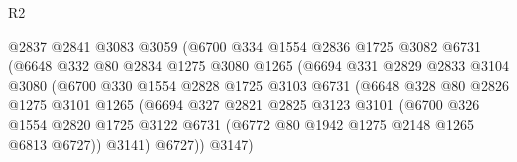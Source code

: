 \begin{lexlean}{R2}
\begin{coremodule}
                                  @2837
                                  @2841
                                  @3083
                                  @3059
                                  (@6700
                                    @334
                                    @1554
                                    @2836
                                    @1725
                                    @3082
                                    @6731
                                    (@6648
                                      @332
                                      @80
                                      @2834
                                      @1275
                                      @3080
                                      @1265
                                      (@6694
                                        @331
                                        @2829
                                        @2833
                                        @3104
                                        @3080
                                        (@6700
                                          @330
                                          @1554
                                          @2828
                                          @1725
                                          @3103
                                          @6731
                                          (@6648
                                            @328
                                            @80
                                            @2826
                                            @1275
                                            @3101
                                            @1265
                                            (@6694
                                              @327
                                              @2821
                                              @2825
                                              @3123
                                              @3101
                                              (@6700
                                                @326
                                                @1554
                                                @2820
                                                @1725
                                                @3122
                                                @6731
                                                (@6772 @80 @1942 @1275 @2148 @1265 @6813 @6727))
                                              @3141)
                                            @6727))
                                        @3147)

\end{coremodule}
\end{lexlean}
